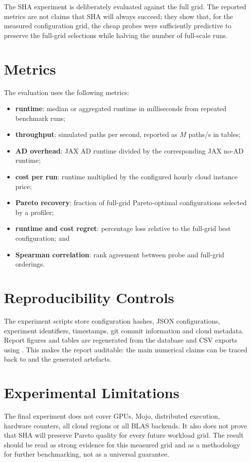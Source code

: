 The SHA experiment is deliberately evaluated against the full grid. The reported metrics are not claims that SHA will always succeed; they show that, for the measured configuration grid, the cheap probes were sufficiently predictive to preserve the full-grid selections while halving the number of full-scale runs.

\section{Metrics}

The evaluation uses the following metrics:
\begin{itemize}
    \item \textbf{runtime}: median or aggregated runtime in milliseconds from repeated benchmark runs;
    \item \textbf{throughput}: simulated paths per second, reported as \(M\) paths/s in tables;
    \item \textbf{AD overhead}: JAX AD runtime divided by the corresponding JAX no-AD runtime;
    \item \textbf{cost per run}: runtime multiplied by the configured hourly cloud instance price;
    \item \textbf{Pareto recovery}: fraction of full-grid Pareto-optimal configurations selected by a profiler;
    \item \textbf{runtime and cost regret}: percentage loss relative to the full-grid best configuration; and
    \item \textbf{Spearman correlation}: rank agreement between probe and full-grid orderings.
\end{itemize}

\section{Reproducibility Controls}

The experiment scripts store configuration hashes, JSON configurations, experiment identifiers, timestamps, git commit information and cloud metadata. Report figures and tables are regenerated from the database and CSV exports using . This makes the report auditable: the main numerical claims can be traced back to  and the generated artefacts.

\section{Experimental Limitations}

The final experiment does not cover GPUs, Mojo, distributed execution, hardware counters, all cloud regions or all BLAS backends. It also does not prove that SHA will preserve Pareto quality for every future workload grid. The result should be read as strong evidence for this measured grid and as a methodology for further benchmarking, not as a universal guarantee.

